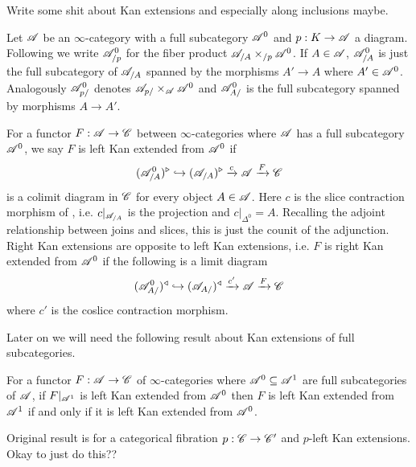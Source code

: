 \documentclass[../thesis.tex]{subfiles}
\begin{document}
Write some shit about Kan extensions and especially along inclusions maybe.
\begin{definition}
    Let $\mathscr{A}$ be an $\infty$-category with a full subcategory $\mathscr{A}^0$ and $p:K\to \mathscr{A}$ a diagram.
    Following \cite[Notation 4.3.2.1]{HTT} we write $\mathscr{A}^0_{/p}$ for the fiber product $\mathscr{A}_{/A}\times_{/p}\mathscr{A}^0$.
    If $A\in \mathscr{A}$, $\mathscr{A}^0_{/A}$ is just the full subcategory of $\mathscr{A}_{/A}$ spanned by the morphisms $A'\to A$ where $A'\in \mathscr{A}^0$.
    \newline
    Analogously $\mathscr{A}^0_{p/}$ denotes $\mathscr{A}_{p/}\times_{\mathscr{A}}\mathscr{A}^0$ and $\mathscr{A}^0_{A/}$ is the full subcategory spanned by morphisms $A\to A'$.
\end{definition}
\begin{definition}
    For a functor $F: \mathscr{A} \to \mathscr{C}$ between $\infty$-categories where $\mathscr{A}$ has a full subcategory $\mathscr{A}^0$, we say $F$ is left Kan extended from $\mathscr{A}^{0}$ if
    \[
        (\mathscr{A}^{0}_{/A})^{\triangleright} \hookrightarrow (\mathscr{A}_{/A})^{\triangleright} \xrightarrow{c} \mathscr{A} \xrightarrow{F}\mathscr{C}
    \]
    is a colimit diagram in $\mathscr{C}$ for every object $A\in \mathscr{A}$.
    Here $c$ is the slice contraction morphism of \cite[\href{https://kerodon.net/tag/0188}{Tag 0188}]{kerodon}, i.e.
    $c|_{\mathscr{A}_{/A}}$ is the projection and $c|_{\Delta^0}=A$.
    Recalling the adjoint relationship between joins and slices, this is just the counit of the adjunction.
    \newline
    Right Kan extensions are opposite to left Kan extensions, i.e. $F$ is right Kan extended from $\mathscr{A}^0$ if the following is a limit diagram
    \[
        (\mathscr{A}^{0}_{A/})^{\triangleleft} \hookrightarrow (\mathscr{A}_{A/})^{\triangleleft} \xrightarrow{c'} \mathscr{A} \xrightarrow{F}\mathscr{C}
    \]
    where $c'$ is the coslice contraction morphism.
\end{definition}
Later on we will need the following result about Kan extensions of full subcategories.
\begin{proposition}\label{4.3.2.8}
    For a functor $F: \mathscr{A}\to\mathscr{C}$ of $\infty$-categories where $\mathscr{A}^0 \subseteq \mathscr{A}^1$ are full subcategories of $\mathscr{A}$, if $F|_{\mathscr{A}^1}$ is left Kan extended from $\mathscr{A}^0$ then $F$ is left Kan extended from $\mathscr{A}^1$ if and only if it is left Kan extended from $\mathscr{A}^0$.
\end{proposition}
\begin{remark}
    Original result is for a categorical fibration $p:\mathscr{C}\to \mathscr{C}'$ and $p$-left Kan extensions. Okay to just do this??
\end{remark}
\end{document}
